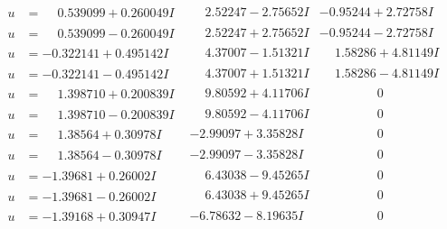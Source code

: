 \documentclass[1p]{elsarticle_modified}
\theoremstyle{definition}
\begin{document}
$$\begin{array}{c|c|c}
\begin{aligned}
u &= \phantom{-}0.539099 + 0.260049 I\end{aligned}
 & \phantom{-}2.52247 - 2.75652 I & -0.95244 + 2.72758 I \\ \hline\begin{aligned}
u &= \phantom{-}0.539099 - 0.260049 I\end{aligned}
 & \phantom{-}2.52247 + 2.75652 I & -0.95244 - 2.72758 I \\ \hline\begin{aligned}
u &= -0.322141 + 0.495142 I\end{aligned}
 & \phantom{-}4.37007 - 1.51321 I & \phantom{-}1.58286 + 4.81149 I \\ \hline\begin{aligned}
u &= -0.322141 - 0.495142 I\end{aligned}
 & \phantom{-}4.37007 + 1.51321 I & \phantom{-}1.58286 - 4.81149 I \\ \hline\begin{aligned}
u &= \phantom{-}1.398710 + 0.200839 I\end{aligned}
 & \phantom{-}9.80592 + 4.11706 I & \phantom{-0.000000 } 0 \\ \hline\begin{aligned}
u &= \phantom{-}1.398710 - 0.200839 I\end{aligned}
 & \phantom{-}9.80592 - 4.11706 I & \phantom{-0.000000 } 0 \\ \hline\begin{aligned}
u &= \phantom{-}1.38564 + 0.30978 I\end{aligned}
 & -2.99097 + 3.35828 I & \phantom{-0.000000 } 0 \\ \hline\begin{aligned}
u &= \phantom{-}1.38564 - 0.30978 I\end{aligned}
 & -2.99097 - 3.35828 I & \phantom{-0.000000 } 0 \\ \hline\begin{aligned}
u &= -1.39681 + 0.26002 I\end{aligned}
 & \phantom{-}6.43038 - 9.45265 I & \phantom{-0.000000 } 0 \\ \hline\begin{aligned}
u &= -1.39681 - 0.26002 I\end{aligned}
 & \phantom{-}6.43038 + 9.45265 I & \phantom{-0.000000 } 0 \\ \hline\begin{aligned}
u &= -1.39168 + 0.30947 I\end{aligned}
 & -6.78632 - 8.19635 I & \phantom{-0.000000 } 0 \\ \hline\begin{aligned}

\end{aligned}
\end{array}$$
\end{document}
